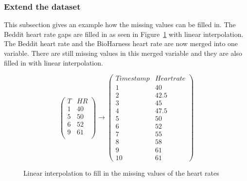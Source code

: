 		\subsubsection{Extend the dataset}
			This subsection gives an example how the missing values can be filled in.	The Beddit heart rate gaps are filled in as seen in Figure~\ref{fig:lin} with linear interpolation. The Beddit heart rate and the BioHarness heart rate are now merged into one variable. There are still missing values in this merged variable and they are also filled in with linear interpolation.

			\begin{figure}[h!]
			\[ 
				\left(
				\begin{array}{rr}
				T & HR \\ \hline
				1 & 40 \\
				5 & 50 \\
				6 & 52 \\
				9 & 61 \\
				\end{array}
				\right)
				\to
				\left(
				\begin{array}{rl}
				Timestamp & Heart rate \\ \hline
				1 & 40 \\
				2 & 42.5 \\
				3 & 45 \\
				4 & 47.5 \\
				5 & 50 \\
				6 & 52 \\
				7 & 55 \\
				8 & 58 \\
				9 & 61 \\
				10 & 61
				\end{array}
				\right)
			\] 
			\caption{Linear interpolation to fill in the missing values of the heart rates}
			\label{fig:lin}
		\end{figure}
		
